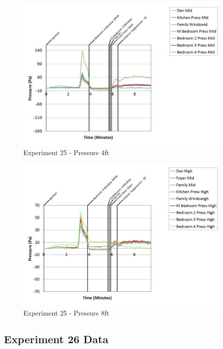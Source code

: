 \documentclass{article}
\begin{document}
\begin{appendices}
	\begin{figure}[h!]
		\centering
		\includegraphics[height=3.05in]{0_Images/Results_Charts/Exp_25_Charts/Pressure4ft.pdf}
		\caption{Experiment 25 - Pressure 4ft}
	\end{figure}
 
	\clearpage

	\begin{figure}[h!]
		\centering
		\includegraphics[height=3.05in]{0_Images/Results_Charts/Exp_25_Charts/Pressure8ft.pdf}
		\caption{Experiment 25 - Pressure 8ft}
	\end{figure}
 

		\clearpage
\clearpage		\large
\subsection{Experiment 26 Data} \label{App:Exp26Results} 


\end{appendices}
\end{document}
